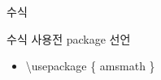 \documentclass[ aspectratio=149,  14pt,blue,xcolor=pdftex,dvipsnames,table,handout,notes]{beamer}
\begin{document}

		\begin{frame}[t]{수식}

			\begin{block} {수식 사용전 package 선언}
			\begin{itemize}
			\item[]	\textbackslash usepackage \{ amsmath \}
			\end{itemize}
			\end{block}

		
		\end{frame}



\end{document}
